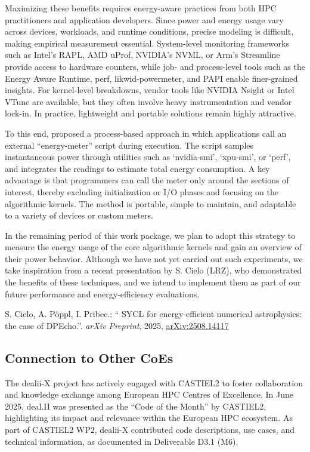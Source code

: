 \documentclass[a4paper,12pt, numbers]{article}
\begin{document}
Maximizing these benefits requires energy-aware practices from both HPC practitioners and application developers. Since power and energy usage vary across devices, workloads, and runtime conditions, precise modeling is difficult, making empirical measurement essential. System-level monitoring frameworks such as Intel’s RAPL, AMD uProf, NVIDIA’s NVML, or Arm’s Streamline provide access to hardware counters, while job- and process-level tools such as the Energy Aware Runtime, perf, likwid-powermeter, and PAPI enable finer-grained insights. For kernel-level breakdowns, vendor tools like NVIDIA Nsight or Intel VTune are available, but they often involve heavy instrumentation and vendor lock-in. In practice, lightweight and portable solutions remain highly attractive.

To this end, \cite{Cielo25} proposed a process-based approach in which applications call an external ``energy-meter'' script during execution. The script samples instantaneous power through utilities such as `nvidia-smi', `xpu-smi', or `perf', and integrates the readings to estimate total energy consumption. A key advantage is that programmers can call the meter only around the sections of interest, thereby excluding initialization or I/O phases and focusing on the algorithmic kernels. The method is portable, simple to maintain, and adaptable to a variety of devices or custom meters. 

In the remaining period of this work package, we plan to adopt this strategy to measure the energy usage of the core algorithmic kernels and gain an overview of their power behavior. Although we have not yet carried out such experiments, we take inspiration from a recent presentation by S. Cielo (LRZ), who demonstrated the benefits of these techniques, and we intend to implement them as part of our future performance and energy-efficiency evaluations.

\begin{thebibliography}{10}
 S. Cielo, A. P\"oppl, I. Pribec.: `` {SYCL} for energy-efficient numerical astrophysics: the case of {DPE}cho.''. \emph{arXiv Preprint}, 2025, \href{https://doi.org/10.48550/arXiv.2508.14117}{arXiv:2508.14117}
\end{thebibliography}

\subsection{Connection to Other CoEs}

The dealii-X project has actively engaged with CASTIEL2 to foster collaboration and knowledge exchange among European HPC Centres of Excellence. In June 2025, deal.II was presented as the “Code of the Month” by CASTIEL2, highlighting its impact and relevance within the European HPC ecosystem. As part of CASTIEL2 WP2, dealii-X contributed code descriptions, use cases, and technical information, as documented in Deliverable D3.1 (M6).
\end{document}
